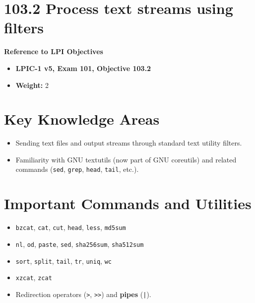 \documentclass[a4paper]{report}
\begin{document}
\newpage
\section*{103.2 Process text streams using filters}

\textbf{Reference to LPI Objectives}
\begin{itemize}
    \item \textbf{LPIC-1 v5, Exam 101, Objective 103.2}
    \item \textbf{Weight:} 2
\end{itemize}

\section*{Key Knowledge Areas}
\begin{itemize}
    \item Sending text files and output streams through standard text utility filters.
    \item Familiarity with GNU textutils (now part of GNU coreutils) and related commands (\texttt{sed}, \texttt{grep}, \texttt{head}, \texttt{tail}, etc.).
\end{itemize}

\section*{Important Commands and Utilities}
\begin{itemize}
    \item \texttt{bzcat}, \texttt{cat}, \texttt{cut}, \texttt{head}, \texttt{less}, \texttt{md5sum}
    \item \texttt{nl}, \texttt{od}, \texttt{paste}, \texttt{sed}, \texttt{sha256sum}, \texttt{sha512sum}
    \item \texttt{sort}, \texttt{split}, \texttt{tail}, \texttt{tr}, \texttt{uniq}, \texttt{wc}
    \item \texttt{xzcat}, \texttt{zcat}
    \item Redirection operators (\texttt{>}, \texttt{>>}) and \textbf{pipes} (\texttt{|}).
\end{itemize}
\end{document}
